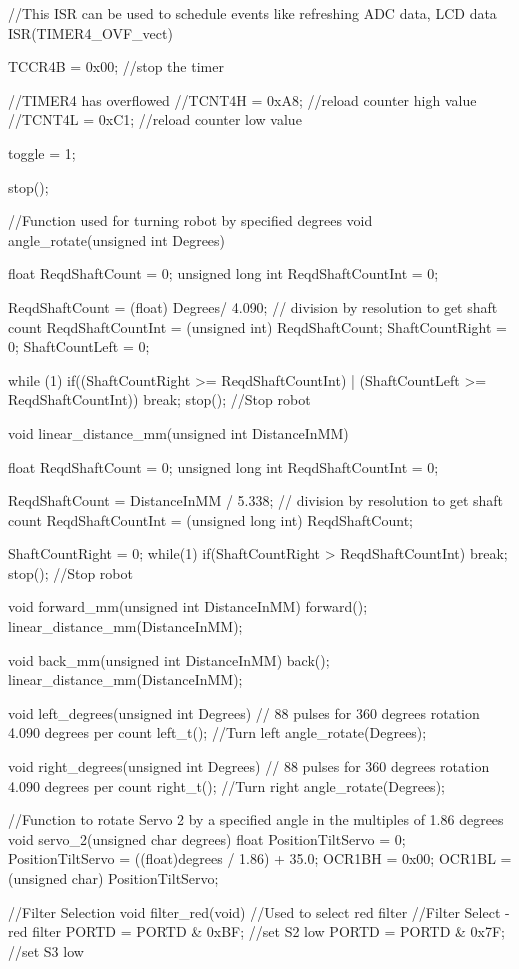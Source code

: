 //This ISR can be used to schedule events like refreshing ADC data, LCD data
ISR(TIMER4_OVF_vect)
{
	TCCR4B = 0x00; //stop the timer
	
	//TIMER4 has overflowed
	//TCNT4H = 0xA8; //reload counter high value
	//TCNT4L = 0xC1; //reload counter low value
	
	toggle = 1;
	
	stop();

}

//Function used for turning robot by specified degrees
void angle_rotate(unsigned int Degrees)
{
	float ReqdShaftCount = 0;
	unsigned long int ReqdShaftCountInt = 0;

	ReqdShaftCount = (float) Degrees/ 4.090; // division by resolution to get shaft count
	ReqdShaftCountInt = (unsigned int) ReqdShaftCount;
	ShaftCountRight = 0;
	ShaftCountLeft = 0;

	while (1)
	{
		if((ShaftCountRight >= ReqdShaftCountInt) | (ShaftCountLeft >= ReqdShaftCountInt))
		break;
	}
	stop(); //Stop robot
}

void linear_distance_mm(unsigned int DistanceInMM)
{   
	float ReqdShaftCount = 0;
	unsigned long int ReqdShaftCountInt = 0;

	ReqdShaftCount = DistanceInMM / 5.338; // division by resolution to get shaft count
	ReqdShaftCountInt = (unsigned long int) ReqdShaftCount;
	
	ShaftCountRight = 0;
	while(1)
	{
		if(ShaftCountRight > ReqdShaftCountInt)
		{
			break;
		}
	}
	stop(); //Stop robot
}

void forward_mm(unsigned int DistanceInMM)
{
	forward();
	linear_distance_mm(DistanceInMM);
}

void back_mm(unsigned int DistanceInMM)
{
	back();
	linear_distance_mm(DistanceInMM);
}

void left_degrees(unsigned int Degrees)
{
	// 88 pulses for 360 degrees rotation 4.090 degrees per count
	left_t(); //Turn left
	angle_rotate(Degrees);
}


void right_degrees(unsigned int Degrees)
{
	// 88 pulses for 360 degrees rotation 4.090 degrees per count
	right_t(); //Turn right
	angle_rotate(Degrees);
}

//Function to rotate Servo 2 by a specified angle in the multiples of 1.86 degrees
void servo_2(unsigned char degrees)
{
	float PositionTiltServo = 0;
	PositionTiltServo = ((float)degrees / 1.86) + 35.0;
	OCR1BH = 0x00;
	OCR1BL = (unsigned char) PositionTiltServo;
}

//Filter Selection
void filter_red(void)    //Used to select red filter
{
	//Filter Select - red filter
	PORTD = PORTD & 0xBF; //set S2 low
	PORTD = PORTD & 0x7F; //set S3 low
}

